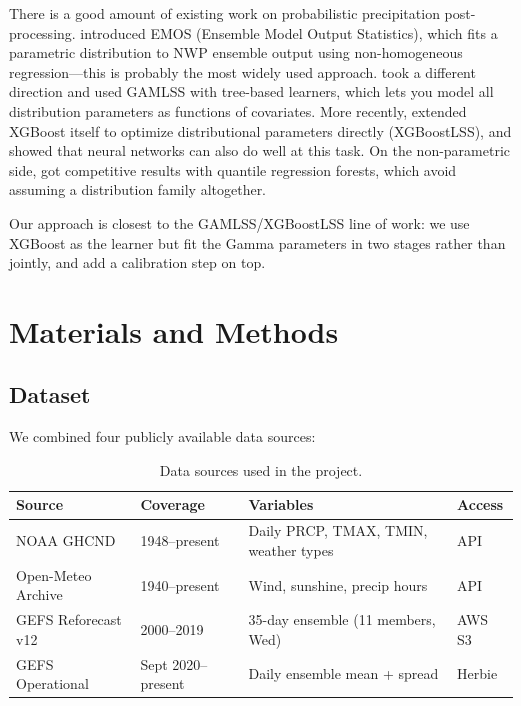 \documentclass[11pt]{article}
\begin{document}
There is a good amount of existing work on probabilistic precipitation post-processing. \citet{gneiting2005} introduced EMOS (Ensemble Model Output Statistics), which fits a parametric distribution to NWP ensemble output using non-homogeneous regression---this is probably the most widely used approach. \citet{schlosser2019} took a different direction and used GAMLSS with tree-based learners, which lets you model all distribution parameters as functions of covariates. More recently, \citet{marz2022} extended XGBoost itself to optimize distributional parameters directly (XGBoostLSS), and \citet{rasp2018} showed that neural networks can also do well at this task. On the non-parametric side, \citet{taillardat2016} got competitive results with quantile regression forests, which avoid assuming a distribution family altogether.

Our approach is closest to the GAMLSS/XGBoostLSS line of work: we use XGBoost as the learner but fit the Gamma parameters in two stages rather than jointly, and add a calibration step on top.

\section{Materials and Methods}

\subsection{Dataset}

We combined four publicly available data sources:

\begin{table}[H]
\centering
\small
\begin{tabular}{@{}llll@{}}
\toprule
\textbf{Source} & \textbf{Coverage} & \textbf{Variables} & \textbf{Access} \\
\midrule
NOAA GHCND & 1948--present & Daily PRCP, TMAX, TMIN, weather types & API \\
Open-Meteo Archive & 1940--present & Wind, sunshine, precip hours & API \\
GEFS Reforecast v12 & 2000--2019 & 35-day ensemble (11 members, Wed) & AWS S3 \\
GEFS Operational & Sept 2020--present & Daily ensemble mean + spread & Herbie \\
\bottomrule
\end{tabular}
\caption{Data sources used in the project.}
\end{table}
\end{document}
